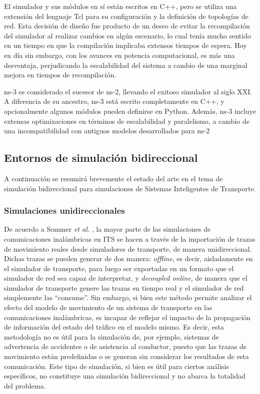 El simulador y sus módulos en sí están escritos en C++, pero se utiliza una extensión del lenguaje Tcl para su configuración y la definición de topologías de red. Esta decisión de diseño fue producto de un deseo de evitar la recompilación del simulador al realizar cambios en algún escenario, lo cual tenía mucho sentido en un tiempo en que la compilación implicaba extensos tiempos de espera. Hoy en día sin embargo, con los avances en potencia computacional, es más una desventaja, perjudicando la escalabilidad del sistema \autocite{perf_comp_recentnetworksims} a cambio de una marginal mejora en tiempos de recompilación. 

ns-3 es considerado el sucesor de ns-2, llevando el exitoso simulador al siglo XXI. A diferencia de su ancestro, ns-3 está escrito completamente en C++, y opcionalmente algunos módulos pueden definirse en Python. Además, ns-3 incluye extensas optimizaciones en términos de escalabilidad y paralelismo, a cambio de una incompatibilidad con antiguos modelos desarrollados para ns-2

\subsection{Entornos de simulación bidireccional}

A continuación se resumirá brevemente el estado del arte en el tema de simulación bidireccional para simulaciones de Sistemas Inteligentes de Transporte. 

\subsubsection{Simulaciones unidireccionales}

De acuerdo a Sommer \emph{et al.} \autocite{bidirectionalsimul}, la mayor parte de las simulaciones de comunicaciones inalámbricas en ITS se hacen a través de la importación de trazas de movimiento reales desde simuladores de transporte, de manera unidireccional. Dichas trazas se pueden generar de dos manera: \textit{offline}, es decir, aisladamente en el simulador de transporte, para luego ser exportadas en un formato que el simulador de red sea capaz de interpretar, y \textit{decoupled online}, de manera que el simulador de transporte genere las trazas en tiempo real y el simulador de red simplemente las ``consume''. Sin embargo, si bien este método permite analizar el efecto del modelo de movimiento de un sistema de transporte en las comunicaciones inalámbricas, es incapaz de reflejar el impacto de la propagación de información del estado del tráfico en el modelo mismo. Es decir, esta metodología no es útil para la simulación de, por ejemplo, sistemas de advertencia de accidentes o de asistencia al conductor, puesto que las trazas de movimiento están predefinidas o se generan sin considerar los resultados de esta comunicación. Este tipo de simulación, si bien es útil para ciertos análisis específicos, no constituye una simulación bidireccional y no abarca la totalidad del problema.

